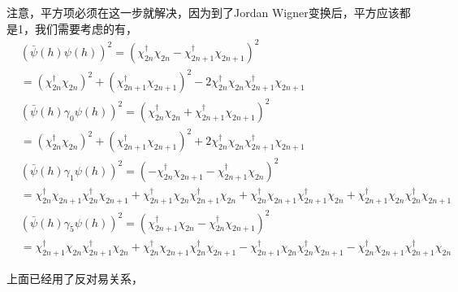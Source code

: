 注意，平方项必须在这一步就解决，因为到了Jordan Wigner变换后，平方应该都是1，我们需要考虑的有，
\begin{equation}
\begin{split}
&(\bar{\psi}(h) \psi(h) )^2=(\chi ^{\dagger}_{2n}\chi _{2n}-\chi ^{\dagger}_{2n+1}\chi _{2n+1})^2\\
&=(\chi ^{\dagger}_{2n}\chi _{2n})^2+(\chi ^{\dagger}_{2n+1}\chi _{2n+1})^2-2\chi ^{\dagger}_{2n}\chi _{2n}\chi ^{\dagger}_{2n+1}\chi _{2n+1}\\
&(\bar{\psi}(h) \gamma _0 \psi(h) )^2=(\chi ^{\dagger}_{2n}\chi _{2n}+\chi ^{\dagger}_{2n+1}\chi _{2n+1})^2\\
&=(\chi ^{\dagger}_{2n}\chi _{2n})^2+(\chi ^{\dagger}_{2n+1}\chi _{2n+1})^2+2\chi ^{\dagger}_{2n}\chi _{2n}\chi ^{\dagger}_{2n+1}\chi _{2n+1}\\
&(\bar{\psi}(h) \gamma _1 \psi(h) )^2=(-\chi ^{\dagger}_{2n}\chi _{2n+1}-\chi ^{\dagger}_{2n+1}\chi _{2n})^2\\
&=\chi ^{\dagger}_{2n}\chi _{2n+1}\chi ^{\dagger}_{2n}\chi _{2n+1}+\chi ^{\dagger}_{2n+1}\chi _{2n}\chi ^{\dagger}_{2n+1}\chi _{2n}+\chi ^{\dagger}_{2n}\chi _{2n+1}\chi ^{\dagger}_{2n+1}\chi _{2n}+\chi ^{\dagger}_{2n+1}\chi _{2n}\chi ^{\dagger}_{2n}\chi _{2n+1}\\
&(\bar{\psi}(h) \gamma _5 \psi(h) )^2=(\chi ^{\dagger}_{2n+1}\chi _{2n} - \chi ^{\dagger}_{2n}\chi _{2n+1})^2\\
&=\chi ^{\dagger}_{2n+1}\chi _{2n}\chi ^{\dagger}_{2n+1}\chi _{2n}+\chi ^{\dagger}_{2n}\chi _{2n+1}\chi ^{\dagger}_{2n}\chi _{2n+1}-\chi ^{\dagger}_{2n+1}\chi _{2n} \chi ^{\dagger}_{2n}\chi _{2n+1}-\chi ^{\dagger}_{2n}\chi _{2n+1}\chi ^{\dagger}_{2n+1}\chi _{2n}
\end{split}
\end{equation}

上面已经用了反对易关系，


